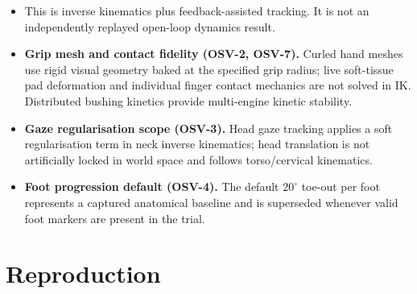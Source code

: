 \documentclass[11pt]{article}
\begin{document}
\begin{itemize}
    regenerated.
  \item This is inverse kinematics plus feedback-assisted tracking. It is
    not an independently replayed open-loop dynamics result.
  \item \textbf{Grip mesh and contact fidelity (OSV-2, OSV-7).} Curled hand meshes
    use rigid visual geometry baked at the specified grip radius; live soft-tissue
    pad deformation and individual finger contact mechanics are not solved in IK.
    Distributed bushing kinetics provide multi-engine kinetic stability.
  \item \textbf{Gaze regularisation scope (OSV-3).} Head gaze tracking applies
    a soft regularisation term in neck inverse kinematics; head translation is not
    artificially locked in world space and follows torso/cervical kinematics.
  \item \textbf{Foot progression default (OSV-4).} The default $20^\circ$ toe-out
    per foot represents a captured anatomical baseline and is superseded whenever
    valid foot markers are present in the trial.
\end{itemize}

\section{Reproduction}
\end{document}

